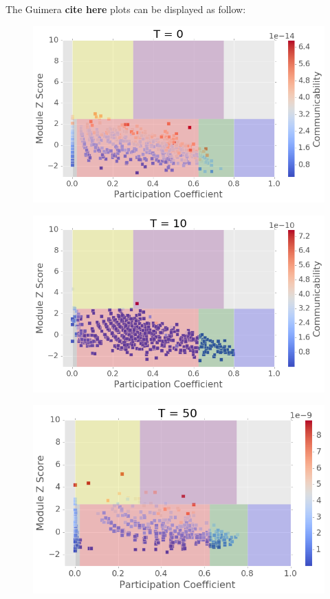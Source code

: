 \documentclass[%
 reprint,
 amsmath,amssymb,
 aps,
]{revtex4-2}
\begin{document}
The Guimera \textbf{cite here} plots can be displayed as follow:
 
\begin{figure}[h]
	\centering
	\includegraphics[width=1\linewidth]{figure/guimera_t0}
	\caption{}
	\label{fig:guimera_t0}
\end{figure}

\begin{figure}[h]
	\centering
	\includegraphics[width=1\linewidth]{figure/guimera_t10}
	\caption{}
	\label{fig:guimera_t10}
\end{figure}

\begin{figure}[h]
	\centering
	\includegraphics[width=1\linewidth]{figure/guimera_t50}
	\caption{}
	\label{fig:guimera_t50}
\end{figure}
\end{document}
